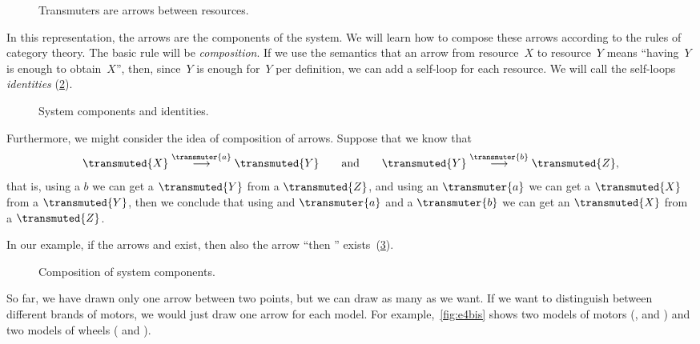 
\begin{figure}[h!]
  \centering
  \caption{Transmuters are arrows between resources. \label{fig:e2}}
\end{figure}

In this representation, the arrows are the components of the system.
We will learn how to compose these arrows according to the rules of category theory.
The basic rule will be \emph{composition}.
If we use the semantics that an arrow from resource~$X$ to resource~$Y$ means ``having~$Y$ is
enough to obtain~$X$'', then, since~$Y$ is enough for~$Y$ per definition, we can add a self-loop for each
resource. We will call the self-loops \emph{identities} (\cref{fig:e3}).

\begin{figure}[h!]
  \centering
  \caption{System components and identities. \label{fig:e3}}
\end{figure}

Furthermore, we might consider the idea of composition of arrows.
Suppose that we know that
\begin{equation*}
  \transmuted{X} \stackrel{\transmuter{a}}{\longrightarrow} \transmuted{Y}
  \qquad \text{and} \qquad
  \transmuted{Y} \stackrel{\transmuter{b}}{\longrightarrow} \transmuted{Z},
\end{equation*}
that is, using a $b$ we can get a $\transmuted{Y}$ from a $\transmuted{Z}$, and using an $\transmuter{a}$ we can get a $\transmuted{X}$ from a $\transmuted{Y}$,
then we conclude that using and $\transmuter{a}$ and a $\transmuter{b}$ we can get an $\transmuted{X}$ from a $\transmuted{Z}$.

In our example, if the arrows \wheels  and \motor exist, then also the arrow ``\wheels then \motor'' exists~(\cref{fig:e4}).

\begin{figure}[h!]
  \centering
  \caption{Composition of system components. \label{fig:e4}}
\end{figure}

So far, we have drawn only one arrow between two points, but we can draw as many as we want.
If we want to distinguish between different brands of motors, we would just draw
one arrow for each model. For example,~\cref{fig:e4bis} shows two models of
motors (, and ) and two models of wheels
( and ).


